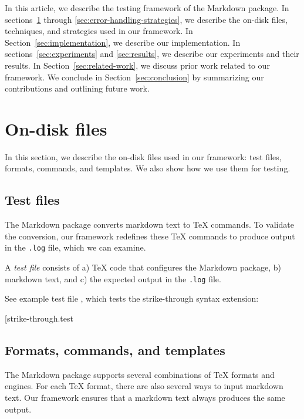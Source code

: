 \documentclass[final]{ltugboat}
\begin{document}
In this article, we describe the testing framework of the Markdown package. In sections~\ref{sec:on-disk-files} through \ref{sec:error-handling-strategies}, we describe the on-disk files, techniques, and strategies used in our framework. In Section~\ref{sec:implementation}, we describe our implementation. In sections~\ref{sec:experiments} and \ref{sec:results}, we describe our experiments and their results. In Section~\ref{sec:related-work}, we discuss prior work related to our framework. We conclude in Section~\ref{sec:conclusion} by summarizing our contributions and outlining future work.

\section{On-disk files}
\label{sec:on-disk-files}

In this section, we describe the on-disk files used in our framework: test files, formats, commands, and templates. We also show how we use them for testing.

\subsection{Test files}
\label{sec:test-files}

The Markdown package converts markdown text to \TeX{} commands. To validate the conversion, our framework redefines these \TeX{} commands to produce output in the \texttt{.log} file, which we can examine.

A \emph{test file} consists of a) \TeX{} code that configures the Markdown package, b) markdown text, and c) the expected output in the \texttt{.log} file.

See example test file , which tests the strike-through syntax extension:

\smallskip
\noindent
\example*[{strike-through.test}

\subsection{Formats, commands, and templates}
\label{sec:formats-commands-and-templates}

The Markdown package supports several combinations of \TeX{} formats and engines. For each \TeX{} format, there are also several ways to input markdown text. Our framework ensures that a markdown text always produces the same output.
\end{document}
